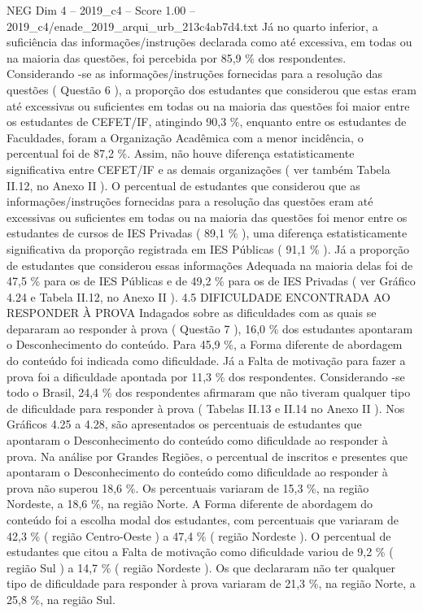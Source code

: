 \begin{textsample}{NEG Dim 4 – 2019\_c4 – Score 1.00 – 2019\_c4/enade\_2019\_arqui\_urb\_213c4ab7d4.txt}
Já no quarto inferior, a suficiência das informações/instruções declarada como até excessiva, em todas ou na maioria das questões, foi percebida por 85,9 \% dos respondentes.
Considerando -se as informações/instruções fornecidas para a resolução das questões ( Questão 6 ), a proporção dos estudantes que considerou que estas eram até excessivas ou suficientes em todas ou na maioria das questões foi maior entre os estudantes de CEFET/IF, atingindo 90,3 \%, enquanto entre os estudantes de Faculdades, foram a Organização Acadêmica com a menor incidência, o percentual foi de 87,2 \%.
Assim, não houve diferença estatisticamente significativa entre CEFET/IF e as demais organizações ( ver também Tabela II.12, no Anexo II ).
O percentual de estudantes que considerou que as informações/instruções fornecidas para a resolução das questões eram até excessivas ou suficientes em todas ou na maioria das questões foi menor entre os estudantes de cursos de IES Privadas ( 89,1 \% ), uma diferença estatisticamente significativa da proporção registrada em IES Públicas ( 91,1 \% ).
Já a proporção de estudantes que considerou essas informações Adequada na maioria delas foi de 47,5 \% para os de IES Públicas e de 49,2 \% para os de IES Privadas ( ver Gráfico 4.24 e Tabela II.12, no Anexo II ). 4.5 DIFICULDADE ENCONTRADA AO RESPONDER À PROVA Indagados sobre as dificuldades com as quais se depararam ao responder à prova ( Questão 7 ), 16,0 \% dos estudantes apontaram o Desconhecimento do conteúdo.
Para 45,9 \%, a Forma diferente de abordagem do conteúdo foi indicada como dificuldade.
Já a Falta de motivação para fazer a prova foi a dificuldade apontada por 11,3 \% dos respondentes.
Considerando -se todo o Brasil, 24,4 \% dos respondentes afirmaram que não tiveram qualquer tipo de dificuldade para responder à prova ( Tabelas II.13 e II.14 no Anexo II ).
Nos Gráficos 4.25 a 4.28, são apresentados os percentuais de estudantes que apontaram o Desconhecimento do conteúdo como dificuldade ao responder à prova.
Na análise por Grandes Regiões, o percentual de inscritos e presentes que apontaram o Desconhecimento do conteúdo como dificuldade ao responder à prova não superou 18,6 \%.
Os percentuais variaram de 15,3 \%, na região Nordeste, a 18,6 \%, na região Norte.
A Forma diferente de abordagem do conteúdo foi a escolha modal dos estudantes, com percentuais que variaram de 42,3 \% ( região Centro-Oeste ) a 47,4 \% ( região Nordeste ).
O percentual de estudantes que citou a Falta de motivação como dificuldade variou de 9,2 \% ( região Sul ) a 14,7 \% ( região Nordeste ).
Os que declararam não ter qualquer tipo de dificuldade para responder à prova variaram de 21,3 \%, na região Norte, a 25,8 \%, na região Sul.

\end{textsample}
